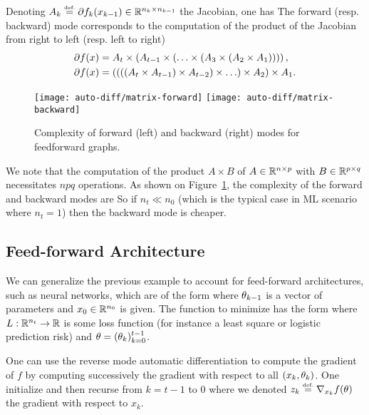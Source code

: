 Denoting $A_k \stackrel{\mbox{\upshape\tiny def.}}{=} \partial f_k(x_{k-1}) \in \mathbb{R}^{n_{k} \times n_{k-1}}$ the Jacobian, one has
The forward (resp. backward) mode corresponds to the computation of the product of the Jacobian from right to left (resp. left to right) 
\begin{align*}
	\partial f(x) &= A_{t} \times \left(   A_{t-1} \times \left(  \ldots \times \left(  A_3 \times \left(  A_2 \times A_1  \right)  \right)  \right)  \right), \\
	\partial f(x) &= \left(  \left(  \left(  \left(  A_{t} \times A_{t-1}  \right)  \times A_{t-2}  \right) \times \ldots  \right) \times A_2  \right) \times A_1.
\end{align*}


\begin{figure}
\centering
\texttt{[image: auto-diff/matrix-forward]} 
\quad\quad
\texttt{[image: auto-diff/matrix-backward]} 
\caption{\label{fig-matrix-mult}
Complexity of forward (left) and backward (right) modes for feedforward graphs.  
}
\end{figure}

We note that the computation of the product $A \times B$ of $A \in \mathbb{R}^{n \times p}$ with $B \in \mathbb{R}^{p \times q}$ necessitates $npq$ operations.
%
As shown on Figure~\ref{fig-matrix-mult}, the complexity of the forward and backward modes are
So if $n_t \ll n_0$ (which is the typical case in ML scenario where $n_t=1$) then the backward mode is cheaper. 


\subsection{Feed-forward Architecture}

We can generalize the previous example to account for feed-forward architectures, such as neural networks, which are of the form
where $\theta_{k-1}$ is a vector of parameters and $x_0 \in \mathbb{R}^{n_0}$ is given. The function to minimize has the form
where $L : \mathbb{R}^{n_t} \rightarrow \mathbb{R}$ is some loss function (for instance a least square or logistic prediction risk) and $\theta=(\theta_k)_{k=0}^{t-1}$.


One can use the reverse mode automatic differentiation to compute the gradient of $f$ by computing successively the gradient with respect to all $(x_k,\theta_k)$. One initialize
and then recurse from $k=t-1$ to $0$
where we denoted $z_k \stackrel{\mbox{\upshape\tiny def.}}{=} \nabla_{x_{k}} f(\theta)$ the gradient with respect to $x_{k}$.

